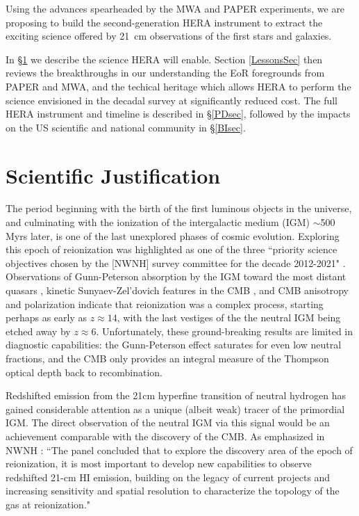 \documentclass[preprint]{aastex}
\begin{document}
Using the advances spearheaded by the MWA and PAPER experiments, we are proposing to build the second-generation HERA instrument to extract the exciting science offered by 21~cm observations of the first stars and galaxies. 

In \S \ref{SJsec} we describe the science HERA will enable. Section \ref{LessonsSec} then reviews the breakthroughs in our understanding the EoR foregrounds from PAPER and MWA, and the techical heritage which allows HERA to perform the science envisioned in the decadal survey at significantly reduced cost. The full HERA instrument and timeline is described in \S \ref{PDsec}, followed by the impacts on the US scientific and national community in \S \ref{BIsec}.


\vspace{-0.25in}
\section{Scientific Justification}
\label{SJsec}

The period beginning with the birth of the first luminous objects in the
universe, and culminating with the ionization of the intergalactic medium (IGM)
$\sim$500 Myrs later, is one of the last unexplored phases of cosmic evolution.
Exploring this epoch of reionization was highlighted as one of the three
``priority science objectives chosen by the [NWNH] survey committee for the
decade 2012-2021" \citep{astro2010}. Observations of Gunn-Peterson absorption
by the IGM toward the most distant quasars \citep{fan_et_al2006}, kinetic
Sunyaev-Zel'dovich features in the CMB \citep{zahn_et_al2012}, and CMB
anisotropy and polarization \citep{page_et_al2007,planck_et_al2013} indicate
that reionization was a complex process, starting perhaps as early as 
$z\approx14$, with the last vestiges of the the neutral IGM being etched away by
$z\approx6$.  Unfortunately, these ground-breaking results are limited in
diagnostic capabilities: the Gunn-Peterson effect saturates for even low
neutral fractions, and the CMB only provides an integral measure of the
Thompson optical depth back to recombination.

Redshifted emission from the 21cm hyperfine transition of neutral hydrogen has
gained considerable attention as a unique (albeit weak) tracer of the
primordial IGM.  The direct observation of the neutral IGM via this signal
would be an achievement comparable with the discovery of the CMB.  As
emphasized in NWNH \citep{astro2010}: ``The panel concluded that to explore the
discovery area of the epoch of reionization, it is most important to develop
new capabilities to observe redshifted 21-cm HI emission, building on the
legacy of current projects and increasing sensitivity and spatial resolution to
characterize the topology of the gas at reionization."
\end{document}
